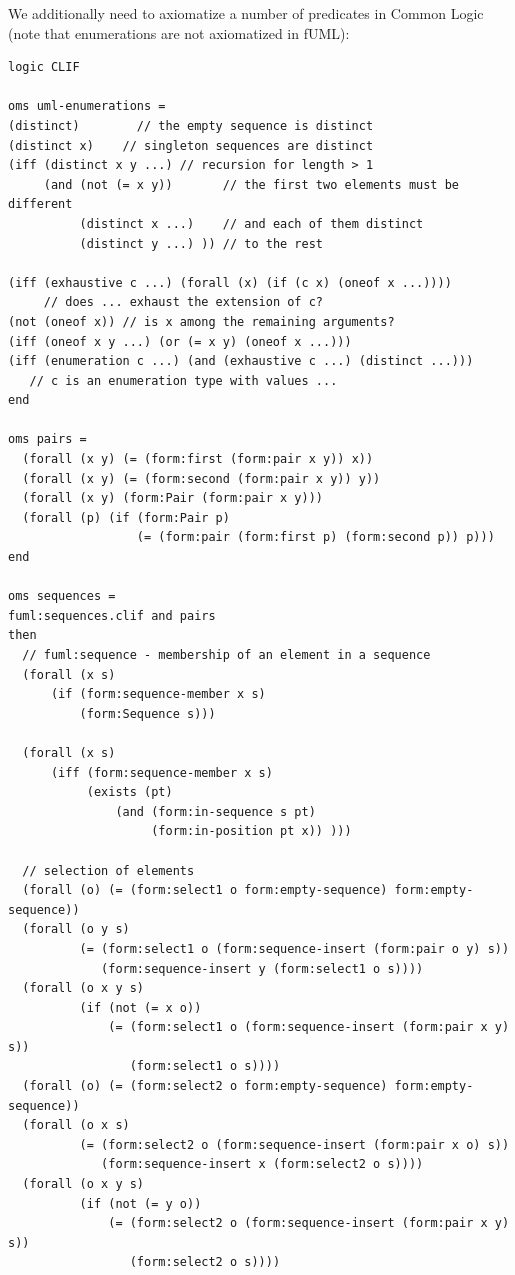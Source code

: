 \documentclass[10pt,fleqn,%
\ifpretendfinal
final%
\else
draft%
\fi,
]{scrreprt}
\begin{document}
We additionally need to axiomatize a number of predicates in Common Logic
(note that enumerations are not axiomatized in fUML):
\begin{lstlisting}[language=clif,morekeywords={then,with,logic,oms,end},mathescape]
logic CLIF

oms uml-enumerations =
(distinct)        // the empty sequence is distinct
(distinct x)    // singleton sequences are distinct
(iff (distinct x y ...) // recursion for length > 1
     (and (not (= x y))       // the first two elements must be different
          (distinct x ...)    // and each of them distinct
          (distinct y ...) )) // to the rest

(iff (exhaustive c ...) (forall (x) (if (c x) (oneof x ...))))
     // does ... exhaust the extension of c?
(not (oneof x)) // is x among the remaining arguments?
(iff (oneof x y ...) (or (= x y) (oneof x ...)))
(iff (enumeration c ...) (and (exhaustive c ...) (distinct ...)))
   // c is an enumeration type with values ...
end

oms pairs =
  (forall (x y) (= (form:first (form:pair x y)) x))
  (forall (x y) (= (form:second (form:pair x y)) y))
  (forall (x y) (form:Pair (form:pair x y)))
  (forall (p) (if (form:Pair p)
                  (= (form:pair (form:first p) (form:second p)) p)))
end

oms sequences =
fuml:sequences.clif and pairs
then
  // fuml:sequence - membership of an element in a sequence
  (forall (x s)
      (if (form:sequence-member x s)
          (form:Sequence s)))

  (forall (x s)
      (iff (form:sequence-member x s)
           (exists (pt) 
               (and (form:in-sequence s pt)
                    (form:in-position pt x)) )))

  // selection of elements
  (forall (o) (= (form:select1 o form:empty-sequence) form:empty-sequence))
  (forall (o y s)
          (= (form:select1 o (form:sequence-insert (form:pair o y) s)) 
             (form:sequence-insert y (form:select1 o s))))
  (forall (o x y s)
          (if (not (= x o))
              (= (form:select1 o (form:sequence-insert (form:pair x y) s)) 
                 (form:select1 o s))))
  (forall (o) (= (form:select2 o form:empty-sequence) form:empty-sequence))
  (forall (o x s)
          (= (form:select2 o (form:sequence-insert (form:pair x o) s)) 
             (form:sequence-insert x (form:select2 o s))))
  (forall (o x y s)
          (if (not (= y o))
              (= (form:select2 o (form:sequence-insert (form:pair x y) s)) 
                 (form:select2 o s))))


\end{lstlisting}
\end{document}
